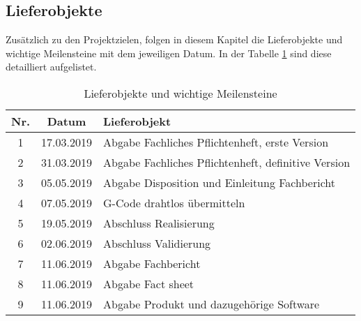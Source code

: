 \clearpage
\subsection{Lieferobjekte}\label{subsec:Lieferobjekte}
Zusätzlich zu den Projektzielen, folgen in diesem Kapitel die Lieferobjekte und wichtige Meilensteine mit dem jeweiligen Datum. In der Tabelle \ref{tbl:Lieferobjekte} sind diese detailliert aufgelistet.  


\begin{table}[H]
     \centering
\begin{tabular}{|c|c|l|}\hline
   \textbf{Nr.} & \textbf{Datum} & \textbf{Lieferobjekt} \\ \hline
   1 & 17.03.2019 & Abgabe Fachliches Pflichtenheft, erste Version \\ \hline 
   2 & 31.03.2019 & Abgabe Fachliches Pflichtenheft, definitive Version \\ \hline
   3 & 05.05.2019 & Abgabe Disposition und Einleitung Fachbericht \\ \hline
   4 & 07.05.2019 & G-Code drahtlos übermitteln \\ \hline   
   5 & 19.05.2019 & Abschluss Realisierung \\ \hline   
   6 & 02.06.2019 & Abschluss Validierung \\ \hline   
   7 & 11.06.2019 & Abgabe Fachbericht \\ \hline
   8 & 11.06.2019 & Abgabe Fact sheet \\ \hline
   9 & 11.06.2019 & Abgabe Produkt und dazugehörige Software \\ \hline   
   
 \end{tabular}
     \caption{Lieferobjekte und wichtige Meilensteine}
     \label{tbl:Lieferobjekte}
\end{table}









